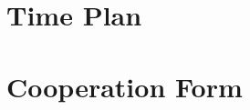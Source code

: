 \documentclass[a4paper,10pt,table,xcdraw]{thesis}
\begin{document}
	\chapter{Time Plan}
	
	\newpage
	
	\chapter{Cooperation Form}
	
	\newpage
	
	\printbibliography
	
\end{document}

